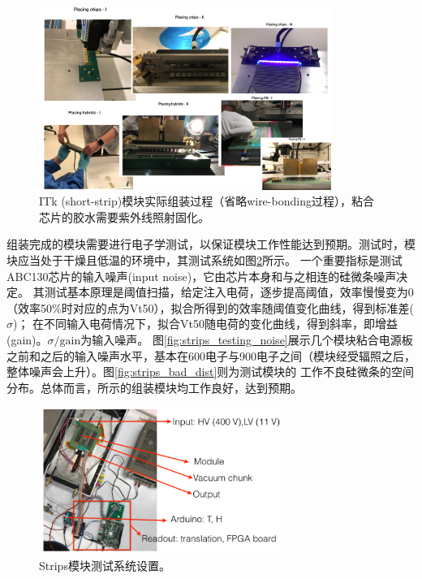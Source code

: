\begin{figure}[h]
\centering
 \includegraphics[width=0.85\textwidth]{fig/strips_module_assembly.png}
 \caption{ITk (short-strip)模块实际组装过程（省略wire-bonding过程），粘合芯片的胶水需要紫外线照射固化。}
 \label{fig:strip_moduel_assembly}
\end{figure}
组装完成的模块需要进行电子学测试，以保证模块工作性能达到预期。测试时，模块应当处于干燥且低温的环境中，其测试系统如图\ref{fig:strips_testing_setup}所示。
一个重要指标是测试ABC130芯片的输入噪声(input noise)，它由芯片本身和与之相连的硅微条噪声决定。
其测试基本原理是阈值扫描，给定注入电荷，逐步提高阈值，效率慢慢变为0（效率50\%时对应的点为Vt50），拟合所得到的效率随阈值变化曲线，得到标准差($\sigma$)；
在不同输入电荷情况下，拟合Vt50随电荷的变化曲线，得到斜率，即增益(gain)。$\sigma/\text{gain}$为输入噪声。
图\ref{fig:strips_testing_noise}展示几个模块粘合电源板之前和之后的输入噪声水平，基本在600电子与900电子之间（模块经受辐照之后，整体噪声会上升）。图\ref{fig:strips_bad_dist}则为测试模块的
工作不良硅微条的空间分布。总体而言，所示的组装模块均工作良好，达到预期。
\begin{figure}[h]
\centering
 \includegraphics[width=0.70\textwidth]{fig/strips_module_setup.png}
 \caption{Strips模块测试系统设置。}
 \label{fig:strips_testing_setup}
\end{figure}
